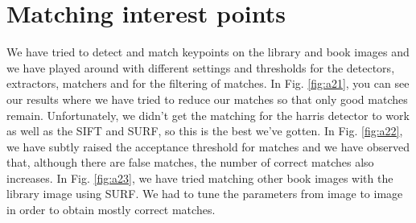 \documentclass[11pt,a4paper]{article}
\begin{document}
\section{Matching interest points}
We have tried to detect and match keypoints on the library and book images and we have played around with different settings and thresholds for the detectors, extractors, matchers and for the filtering of matches. In Fig. \ref{fig:a21}, you can see our results where we have tried to reduce our matches so that only good matches remain. Unfortunately, we didn't get the matching for the harris detector to work as well as the SIFT and SURF, so this is the best we've gotten.
In Fig. \ref{fig:a22}, we have subtly raised the acceptance threshold for matches and we have observed that, although there are false matches, the number of correct matches also increases.
In Fig. \ref{fig:a23}, we have tried matching other book images with the library image using SURF. We had to tune the parameters from image to image in order to obtain mostly correct matches.
\end{document}
